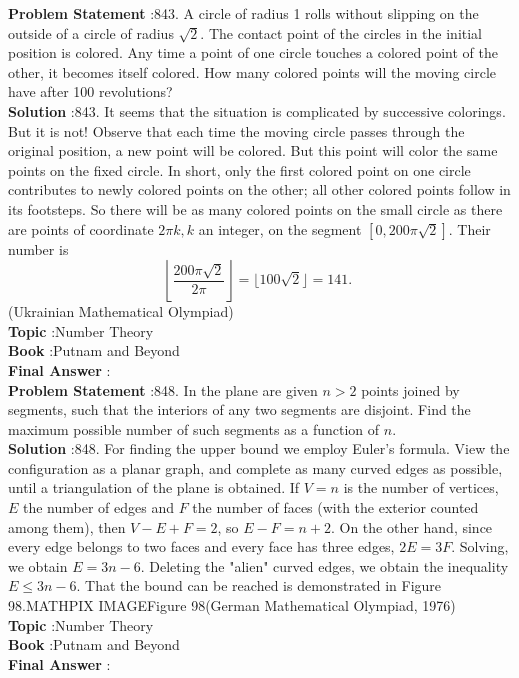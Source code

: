 \documentclass[10pt]{article}
\begin{document}
\textbf{Problem Statement} :843. A circle of radius 1 rolls without slipping on the outside of a circle of radius $\sqrt{2}$. The contact point of the circles in the initial position is colored. Any time a point of one circle touches a colored point of the other, it becomes itself colored. How many colored points will the moving circle have after 100 revolutions?\\
\textbf{Solution} :843. It seems that the situation is complicated by successive colorings. But it is not! Observe that each time the moving circle passes through the original position, a new point will be colored. But this point will color the same points on the fixed circle. In short, only the first colored point on one circle contributes to newly colored points on the other; all other colored points follow in its footsteps. So there will be as many colored points on the small circle as there are points of coordinate $2 \pi k, k$ an integer, on the segment $[0,200 \pi \sqrt{2}]$. Their number is $$ \left\lfloor\frac{200 \pi \sqrt{2}}{2 \pi}\right\rfloor=\lfloor 100 \sqrt{2}\rfloor=141 \text {. } $$(Ukrainian Mathematical Olympiad)\\
\textbf{Topic} :Number Theory\\
\textbf{Book} :Putnam and Beyond\\
\textbf{Final Answer} :\\


\textbf{Problem Statement} :848. In the plane are given $n>2$ points joined by segments, such that the interiors of any two segments are disjoint. Find the maximum possible number of such segments as a function of $n$.\\
\textbf{Solution} :848. For finding the upper bound we employ Euler's formula. View the configuration as a planar graph, and complete as many curved edges as possible, until a triangulation of the plane is obtained. If $V=n$ is the number of vertices, $E$ the number of edges and $F$ the number of faces (with the exterior counted among them), then $V-E+F=2$, so $E-F=n+2$. On the other hand, since every edge belongs to two faces and every face has three edges, $2 E=3 F$. Solving, we obtain $E=3 n-6$. Deleting the "alien" curved edges, we obtain the inequality $E \leq 3 n-6$. That the bound can be reached is demonstrated in Figure 98.MATHPIX IMAGEFigure 98(German Mathematical Olympiad, 1976)\\
\textbf{Topic} :Number Theory\\
\textbf{Book} :Putnam and Beyond\\
\textbf{Final Answer} :\\
\end{document}
